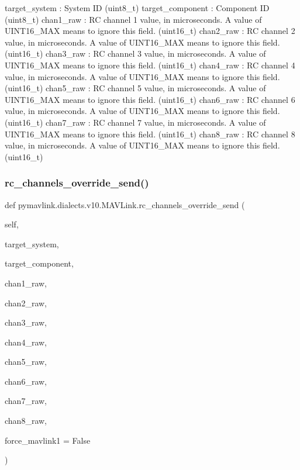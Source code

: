 \begin{DoxyVerb}
\begin{DoxyVerb}
\begin{DoxyVerb}
\begin{DoxyVerb}
\begin{DoxyVerb}
\begin{DoxyVerb}
target_system             : System ID (uint8_t)
target_component          : Component ID (uint8_t)
chan1_raw                 : RC channel 1 value, in microseconds. A value of UINT16_MAX means to ignore this field. (uint16_t)
chan2_raw                 : RC channel 2 value, in microseconds. A value of UINT16_MAX means to ignore this field. (uint16_t)
chan3_raw                 : RC channel 3 value, in microseconds. A value of UINT16_MAX means to ignore this field. (uint16_t)
chan4_raw                 : RC channel 4 value, in microseconds. A value of UINT16_MAX means to ignore this field. (uint16_t)
chan5_raw                 : RC channel 5 value, in microseconds. A value of UINT16_MAX means to ignore this field. (uint16_t)
chan6_raw                 : RC channel 6 value, in microseconds. A value of UINT16_MAX means to ignore this field. (uint16_t)
chan7_raw                 : RC channel 7 value, in microseconds. A value of UINT16_MAX means to ignore this field. (uint16_t)
chan8_raw                 : RC channel 8 value, in microseconds. A value of UINT16_MAX means to ignore this field. (uint16_t)\end{DoxyVerb}
 \mbox{\label{classpymavlink_1_1dialects_1_1v10_1_1MAVLink_a8ab04b7f0f411d1864e77fdd3c441156}} 
\subsubsection{\texorpdfstring{rc\+\_\+channels\+\_\+override\+\_\+send()}{rc\_channels\_override\_send()}}
{\footnotesize\ttfamily def pymavlink.\+dialects.\+v10.\+M\+A\+V\+Link.\+rc\+\_\+channels\+\_\+override\+\_\+send (\begin{DoxyParamCaption}\item[{}]{self,  }\item[{}]{target\+\_\+system,  }\item[{}]{target\+\_\+component,  }\item[{}]{chan1\+\_\+raw,  }\item[{}]{chan2\+\_\+raw,  }\item[{}]{chan3\+\_\+raw,  }\item[{}]{chan4\+\_\+raw,  }\item[{}]{chan5\+\_\+raw,  }\item[{}]{chan6\+\_\+raw,  }\item[{}]{chan7\+\_\+raw,  }\item[{}]{chan8\+\_\+raw,  }\item[{}]{force\+\_\+mavlink1 = {\ttfamily False} }\end{DoxyParamCaption})}


\end{DoxyVerb}
\end{DoxyVerb}
\end{DoxyVerb}
\end{DoxyVerb}
\end{DoxyVerb}
